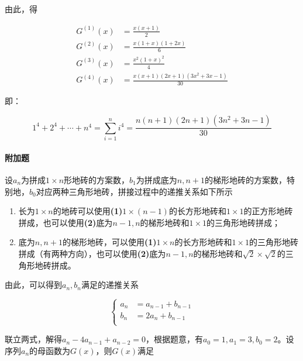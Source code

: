 \documentclass{../notes}
\newcommand{\Gx}[1]{G^{(#1)}(x)}
\begin{document}
    由此，得

    \begin{equation}
        \begin{aligned}
            \Gx 1 &= \frac{x(x+1)}{2} \\
            \Gx 2 &= \frac{x(1+x)(1+2x)}{6} \\
            \Gx 3 &= \frac{x^2(1 + x)^2}{4} \\
            \Gx 4 &= \frac{x(x+1) (2x+1) \left(3x^2+3 x-1\right)}{30}
        \end{aligned}
    \end{equation}

    即：

    \begin{equation}
        1^4 + 2^4 + \cdots + n^4 = \sum_{i=1}^n i^4 = \frac{n(n+1) (2n+1) \left(3n^2+3 n-1\right)}{30}
    \end{equation}

    \paragraph*{附加题} 设$a_n$为拼成$1\times n$形地砖的方案数，$b_1$为拼成底为$n, n+1$的梯形地砖的方案数，特别地，$b_0$对应两种三角形地砖，拼接过程中的递推关系如下所示

    \begin{enumerate}
        \item 长为$1\times n$的地砖可以使用\textbf{(1)}$1\times (n-1)$的长方形地砖和$1\times 1$的正方形地砖拼成，也可以使用\textbf{(2)}底为$n-1, n$的梯形地砖和$1\times 1$的三角形地砖拼成；
        \item 底为$n, n+1$的梯形地砖，可以使用\textbf{(1)}$1\times n$的长方形地砖和$1\times 1$的三角形地砖拼成（有两种方向），也可以使用\textbf{(2)}底为$n-1, n$的梯形地砖和$\sqrt 2\times \sqrt 2$的三角形地砖拼成。
    \end{enumerate}

    由此，可以得到$a_n, b_n$满足的递推关系

    \begin{equation}
        \left\{
        \begin{aligned}
            a_n &= a_{n-1} + b_{n - 1} \\
            b_n &= 2a_{n} + b_{n - 1} \\
        \end{aligned}
        \right.
    \end{equation}

    联立两式，解得$a_n - 4a_{n-1} + a_{n-2} = 0$，根据题意，有$a_{0} = 1, a_{1} = 3, b_{0} = 2$。设序列$a_n$的母函数为$G(x)$，则$G(x)$满足
\end{document}
